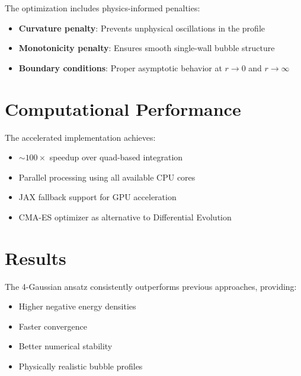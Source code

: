 \documentclass[12pt]{article}
\begin{document}
The optimization includes physics-informed penalties:
\begin{itemize}
\item \textbf{Curvature penalty}: Prevents unphysical oscillations in the profile
\item \textbf{Monotonicity penalty}: Ensures smooth single-wall bubble structure
\item \textbf{Boundary conditions}: Proper asymptotic behavior at \(r \to 0\) and \(r \to \infty\)
\end{itemize}

\section{Computational Performance}

The accelerated implementation achieves:
\begin{itemize}
\item \(\sim100\times\) speedup over quad-based integration
\item Parallel processing using all available CPU cores
\item JAX fallback support for GPU acceleration
\item CMA-ES optimizer as alternative to Differential Evolution
\end{itemize}

\section{Results}

The 4-Gaussian ansatz consistently outperforms previous approaches, providing:
\begin{itemize}
\item Higher negative energy densities
\item Faster convergence
\item Better numerical stability
\item Physically realistic bubble profiles
\end{itemize}
\end{document}
